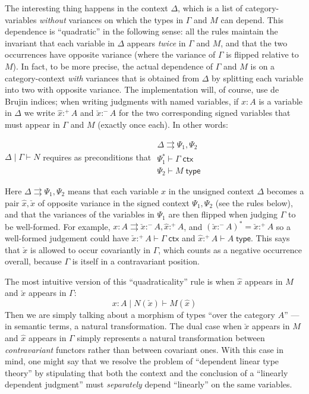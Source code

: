 \documentclass{amsart}
\let\types\vdash %
\def\cb{\mid} %
\def\p{^+} %
\def\m{^-}
\def\type{\;\mathsf{type}}
\def\ctx{\;\mathsf{ctx}}
\let\splits\rightrightarrows
\def\flip#1{#1^*} %
\begin{document}
The interesting thing happens in the context $\Delta$, which is a list of category-variables \emph{without} variances on which the types in $\Gamma$ and $M$ can depend.
This dependence is ``quadratic'' in the following sense: all the rules maintain the invariant that each variable in $\Delta$ appears \emph{twice} in $\Gamma$ and $M$, and that the two occurrences have opposite variance (where the variance of $\Gamma$ is flipped relative to $M$).
In fact, to be more precise, the actual dependence of $\Gamma$ and $M$ is on a category-context \emph{with} variances that is obtained from $\Delta$ by splitting each variable into two with opposite variance.
The implementation will, of course, use de Brujin indices; when writing judgments with named variables, if $x:A$ is a variable in $\Delta$ we write $\hat{x}:\p A$ and $\check{x}:\m A$ for the two corresponding signed variables that must appear in $\Gamma$ and $M$ (exactly once each).
In other words:
\begin{center}
  $\Delta\cb\Gamma\types N$ requires as preconditions that
  $\begin{array}{c}
    \Delta \splits \Psi_1,\Psi_2 \\
    \flip{\Psi_1} \types \Gamma \ctx\\
    \Psi_2 \types M \type
  \end{array}$
\end{center}
Here $\Delta\splits \Psi_1,\Psi_2$ means that each variable $x$ in the unsigned context $\Delta$ becomes a pair $\hat x, \check x$ of opposite variance in the signed context $\Psi_1,\Psi_2$ (see the rules below), and that the variances of the variables in $\Psi_1$ are then flipped when judging $\Gamma$ to be well-formed.  For example,
$x:A \splits \check x : \m A, \hat x :\p A$, and $\flip{(\check x :\m A)} = \check{x} :\p A$ so a well-formed judgement could have 
$\check x :\p A \types \Gamma \ctx$ and $\hat x :\p A \types A \type$. This says that $\check{x}$ is allowed to occur covariantly in $\Gamma$, which counts as a negative occurrence overall, because $\Gamma$ is itself in a contravariant position.  

The most intuitive version of this ``quadraticality'' rule is when $\hat{x}$ appears in $M$ and $\check{x}$ appears in $\Gamma$:
\[ x:A \cb N(\check x) \types M(\hat x) \]
Then we are simply talking about a morphism of types ``over the category $A$'' --- in semantic terms, a natural transformation.
The dual case when $\check{x}$ appears in $M$ and $\hat{x}$ appears in $\Gamma$ simply represents a natural transformation between \emph{contravariant} functors rather than between covariant ones.
With this case in mind, one might say that we resolve the problem of ``dependent linear type theory'' by stipulating that both the context and the conclusion of a ``linearly dependent judgment'' must \emph{separately} depend ``linearly'' on the same variables.
\end{document}
